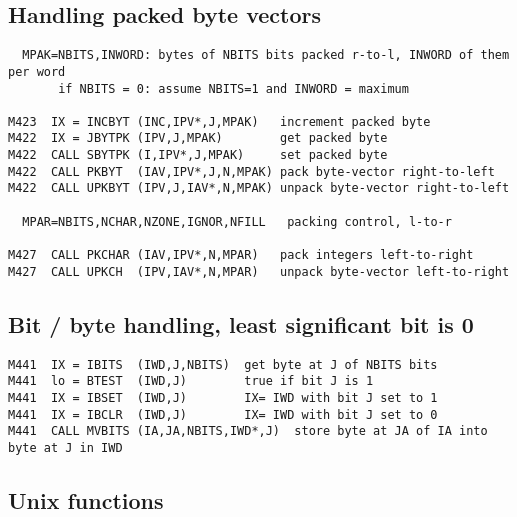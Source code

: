 \subsection*{Handling packed byte vectors}

\begin{verbatim}
  MPAK=NBITS,INWORD: bytes of NBITS bits packed r-to-l, INWORD of them per word
       if NBITS = 0: assume NBITS=1 and INWORD = maximum

M423  IX = INCBYT (INC,IPV*,J,MPAK)   increment packed byte
M422  IX = JBYTPK (IPV,J,MPAK)        get packed byte
M422  CALL SBYTPK (I,IPV*,J,MPAK)     set packed byte
M422  CALL PKBYT  (IAV,IPV*,J,N,MPAK) pack byte-vector right-to-left
M422  CALL UPKBYT (IPV,J,IAV*,N,MPAK) unpack byte-vector right-to-left

  MPAR=NBITS,NCHAR,NZONE,IGNOR,NFILL   packing control, l-to-r

M427  CALL PKCHAR (IAV,IPV*,N,MPAR)   pack integers left-to-right
M427  CALL UPKCH  (IPV,IAV*,N,MPAR)   unpack byte-vector left-to-right
\end{verbatim}

\subsection*{Bit / byte handling, least significant bit is 0}

\begin{verbatim}
M441  IX = IBITS  (IWD,J,NBITS)  get byte at J of NBITS bits
M441  lo = BTEST  (IWD,J)        true if bit J is 1
M441  IX = IBSET  (IWD,J)        IX= IWD with bit J set to 1
M441  IX = IBCLR  (IWD,J)        IX= IWD with bit J set to 0
M441  CALL MVBITS (IA,JA,NBITS,IWD*,J)  store byte at JA of IA into byte at J in IWD
\end{verbatim}

\subsection*{Unix functions}

